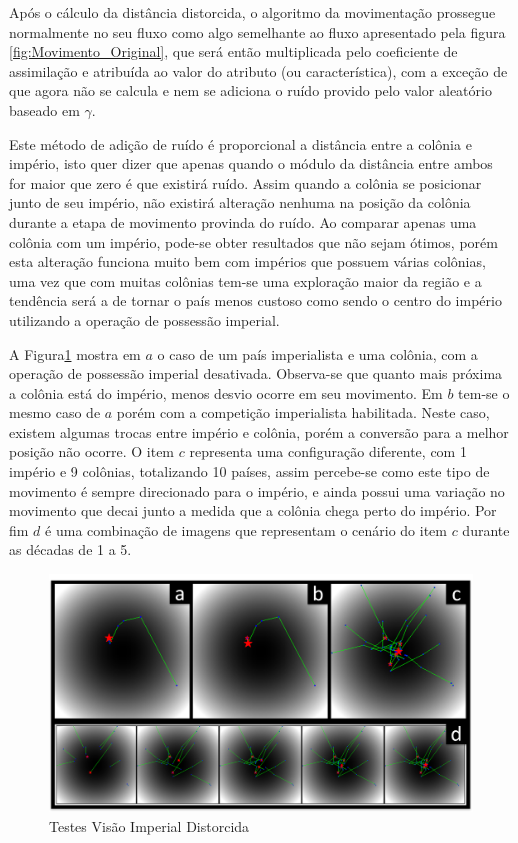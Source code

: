 Após o cálculo da distância distorcida, o algoritmo da movimentação prossegue normalmente no seu fluxo como algo semelhante ao fluxo apresentado pela figura \ref{fig:Movimento_Original}, que será então multiplicada pelo coeficiente de assimilação e atribuída ao valor do atributo (ou característica), com a exceção de que agora não se calcula e nem se adiciona o ruído provido pelo valor aleatório baseado em \(\gamma\). 

Este método de adição de ruído é proporcional a distância entre a colônia e império, isto quer dizer que apenas quando o módulo da distância entre ambos for maior que zero é que existirá ruído. Assim quando a colônia se posicionar junto de seu império, não existirá alteração nenhuma na posição da colônia durante a etapa de movimento provinda do ruído. Ao comparar apenas uma colônia com um império, pode-se obter resultados que não sejam ótimos, porém esta alteração funciona muito bem com impérios que possuem várias colônias, uma vez que com muitas colônias tem-se uma exploração maior da região e a tendência será a de tornar o país menos custoso como sendo o centro do império utilizando a operação de possessão imperial.


A Figura\ref{fig:Testes_Vis_o_Imperial_Distorcida} mostra em \(a\) o caso de um país imperialista e uma colônia, com a operação de possessão imperial desativada. Observa-se que quanto mais próxima a colônia está do império, menos desvio ocorre em seu movimento. Em \(b\) tem-se o mesmo caso de \(a\) porém com a competição imperialista habilitada. Neste caso, existem algumas trocas entre império e colônia, porém a conversão para a melhor posição não ocorre. O item \(c\) representa uma configuração diferente, com 1 império e 9 colônias, totalizando 10 países, assim percebe-se como este tipo de movimento é sempre direcionado para o império, e ainda possui uma variação no movimento que decai junto a medida que a colônia chega perto do império. Por fim \(d\) é uma combinação de imagens que representam o cenário do item \(c\) durante as décadas de 1 a 5.

\begin{figure}[h]
	\centering
	\includegraphics[scale=0.6]{Figuras/Testes_Vis_o_Imperial_Distorcida.png}
	\caption{Testes Visão Imperial Distorcida}
	\label{fig:Testes_Vis_o_Imperial_Distorcida}
\end{figure}


